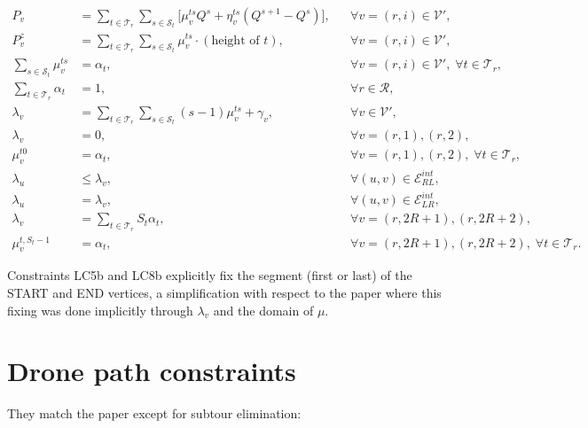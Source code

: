 \documentclass[12pt]{article}
\begin{document}
\begin{align}
  P_v &= \sum_{t\in\mathcal T_r}\sum_{s\in\mathcal S_t}
        \bigl[ \mu_v^{ts} Q^s + \eta_v^{ts} (Q^{s+1}-Q^s) \bigr],
        && \forall v=(r,i)\in\mathcal V', \tag{LC1}\\
  P_v^z &= \sum_{t\in\mathcal T_r}\sum_{s\in\mathcal S_t} \mu_v^{ts} \cdot (\text{height of }t),
        && \forall v=(r,i)\in\mathcal V', \tag{LC1z}\\
  \sum_{s\in\mathcal S_t} \mu_v^{ts} &= \alpha_t,
        && \forall v=(r,i)\in\mathcal V',\; \forall t\in\mathcal T_r, \tag{LC2}\\
  \sum_{t\in\mathcal T_r} \alpha_t &= 1,
        && \forall r\in\mathcal R, \tag{LC3}\\
  \lambda_v &= \sum_{t\in\mathcal T_r}\sum_{s\in\mathcal S_t} (s-1)\mu_v^{ts} + \gamma_v,
        && \forall v\in\mathcal V', \tag{LC4}\\
  \lambda_v &= 0,
        &&\forall v=(r,1),(r,2), \tag{LC5}\\
  \mu_v^{t0} &= \alpha_t,
        &&\forall v=(r,1),(r,2),\; \forall t\in\mathcal T_r, \tag{LC5b (new)}\\
  \lambda_u &\le \lambda_v,
        &&\forall (u,v)\in\mathcal E_{RL}^{int}, \tag{LC6}\\
  \lambda_u &= \lambda_v,
        &&\forall (u,v)\in\mathcal E_{LR}^{int}, \tag{LC7}\\
  \lambda_v &= \sum_{t\in\mathcal T_r} S_t \alpha_t,
        &&\forall v=(r,2R+1),(r,2R+2), \tag{LC8}\\
  \mu_v^{t,S_t-1} &= \alpha_t,
        &&\forall v=(r,2R+1),(r,2R+2),\; \forall t\in\mathcal T_r. \tag{LC8b (new)}
\end{align}

Constraints LC5b and LC8b explicitly fix the segment (first or last)
of the START and END vertices, a simplification with respect to the paper
where this fixing was done implicitly through $\lambda_v$ and the domain
of $\mu$.

\section{Drone path constraints}

They match the paper except for subtour elimination:
\end{document}
